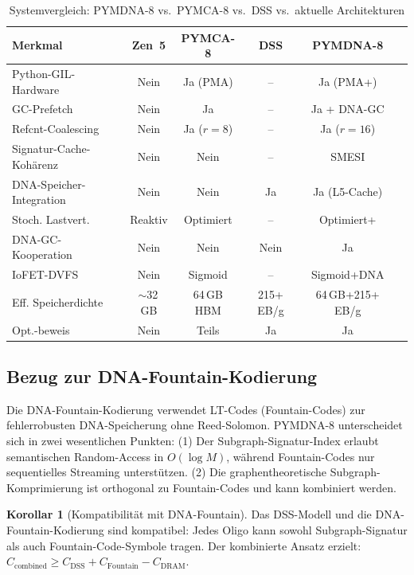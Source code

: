 ﻿\documentclass[a4paper,12pt]{article}
\theoremstyle{definition}
\newtheorem{korollar}{Korollar}[section]
\begin{document}
\begin{table}[H]
  \centering
  \caption{Systemvergleich: PYMDNA-8 vs.\ PYMCA-8 vs.\ DSS vs.\ aktuelle Architekturen}
  \label{tab:systemvergleich}
  \renewcommand{\arraystretch}{1.35}
  \begin{tabular}{p{4cm}ccccc}
    \toprule
    \textbf{Merkmal} & \textbf{Zen~5}
    & \textbf{PYMCA-8} & \textbf{DSS}
    & \textbf{PYMDNA-8} \\
    \midrule
    Python-GIL-Hardware & Nein & Ja (PMA) & -- & Ja (PMA+) \\
    GC-Prefetch & Nein & Ja & -- & Ja + DNA-GC \\
    Refcnt-Coalescing & Nein & Ja ($r=8$) & -- & Ja ($r=16$) \\
    Signatur-Cache-Kohärenz & Nein & Nein & -- & SMESI \\
    DNA-Speicher-Integration & Nein & Nein & Ja & Ja (L5-Cache) \\
    Stoch. Lastvert. & Reaktiv & Optimiert & -- & Optimiert+ \\
    DNA-GC-Kooperation & Nein & Nein & Nein & Ja \\
    IoFET-DVFS & Nein & Sigmoid & -- & Sigmoid+DNA \\
    Eff. Speicherdichte & $\sim$32\,GB & 64\,GB HBM & 215+ EB/g & 64\,GB+215+ EB/g \\
    Opt.-beweis & Nein & Teils & Ja & Ja \\
    \bottomrule
  \end{tabular}
\end{table}

\subsection{Bezug zur DNA-Fountain-Kodierung}

Die DNA-Fountain-Kodierung \cite{erlich2017foundation} verwendet LT-Codes
(Fountain-Codes) zur fehlerrobusten DNA-Speicherung ohne Reed-Solomon.
PYMDNA-8 unterscheidet sich in zwei wesentlichen Punkten:
(1) Der Subgraph-Signatur-Index erlaubt semantischen Random-Access in $O(\log M)$,
während Fountain-Codes nur sequentielles Streaming unterstützen.
(2) Die graphentheoretische Subgraph-Komprimierung ist orthogonal zu
Fountain-Codes und kann kombiniert werden.

\begin{korollar}[Kompatibilität mit DNA-Fountain]
  Das DSS-Modell und die DNA-Fountain-Kodierung sind kompatibel:
  Jedes Oligo kann sowohl Subgraph-Signatur als auch Fountain-Code-Symbole
  tragen. Der kombinierte Ansatz erzielt:
  $C_{\mathrm{combined}} \ge C_{\mathrm{DSS}} + C_{\mathrm{Fountain}} - C_{\mathrm{DRAM}}$.
\end{korollar}
\end{document}
